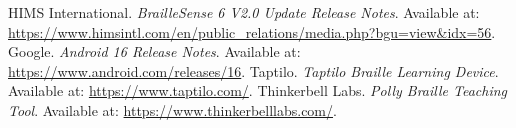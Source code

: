 \begin{thebibliography}{99}
 HIMS International. \textit{BrailleSense 6 V2.0 Update Release Notes}. Available at: \url{https://www.himsintl.com/en/public_relations/media.php?bgu=view&idx=56}.
 Google. \textit{Android 16 Release Notes}. Available at: \url{https://www.android.com/releases/16}.
 Taptilo. \textit{Taptilo Braille Learning Device}. Available at: \url{https://www.taptilo.com/}.
 Thinkerbell Labs. \textit{Polly Braille Teaching Tool}. Available at: \url{https://www.thinkerbelllabs.com/}.
\end{thebibliography}
